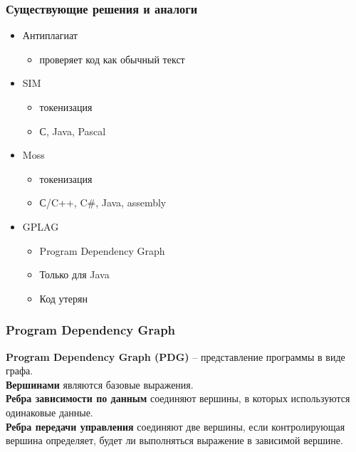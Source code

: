 \documentclass[10pt]{beamer}
\begin{document}
\begin{frame}[fragile]\frametitle{Существующие решения и аналоги}
	\begin{itemize}
		\item Антиплагиат
		\begin{itemize}
			\item проверяет код как обычный текст
		\end{itemize}
		\item SIM
		\begin{itemize}
			\item токенизация
			\item С, Java, Pascal
		\end{itemize}
	    \item Moss
	    \begin{itemize}
	    	\item токенизация
	    	\item С/C++, C#, Java, assembly
	    \end{itemize}
		\item GPLAG
		\begin{itemize}
			\item Program Dependency Graph
			\item Только для Java
			\item Код утерян
		\end{itemize}
	\end{itemize}
\end{frame}

\begin{frame}\frametitle{Program Dependency Graph}
	\begin{definition}
		\textbf{Program Dependency Graph (PDG)} -- представление программы в виде графа. \\
		\textbf{Вершинами} являются базовые выражения. \\
		\textbf{Ребра зависимости по данным} соединяют вершины, в которых используются одинаковые данные. \\
		\textbf{Ребра передачи управления} соединяют две вершины, если контролирующая вершина определяет, будет ли выполняться выражение в зависимой вершине.
	\end{definition}
\end{frame}
\end{document}
